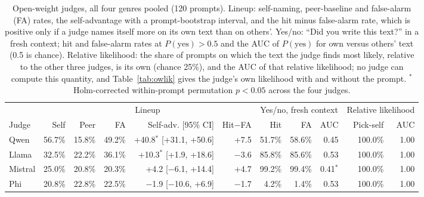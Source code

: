 \begin{table}[t]
\centering\small
\setlength\tabcolsep{3.5pt}
\begin{adjustbox}{max width=\linewidth}
\begin{tabular}{l rrrrr rrr rr}
\toprule
 & \multicolumn{5}{c}{Lineup} & \multicolumn{3}{c}{Yes/no, fresh context} & \multicolumn{2}{c}{Relative likelihood} \\
\cmidrule(lr){2-6}\cmidrule(lr){7-9}\cmidrule(lr){10-11}
Judge & Self & Peer & FA & Self-adv. [95\% CI] & Hit$-$FA & Hit & FA & AUC & Pick-self & AUC \\
\midrule
Qwen & 56.7\% & 15.8\% & 49.2\% & +40.8$^{*}$ [+31.1, +50.6] & +7.5 & 51.7\% & 58.6\% & 0.45 & 100.0\% & 1.00 \\
Llama & 32.5\% & 22.2\% & 36.1\% & +10.3$^{*}$ [+1.9, +18.6] & $-$3.6 & 85.8\% & 85.6\% & 0.53 & 100.0\% & 1.00 \\
Mistral & 25.0\% & 20.8\% & 20.3\% & +4.2 [$-$6.1, +14.4] & +4.7 & 99.2\% & 99.4\% & 0.41$^{*}$ & 100.0\% & 1.00 \\
Phi & 20.8\% & 22.8\% & 22.5\% & $-$1.9 [$-$10.6, +6.9] & $-$1.7 & 4.2\% & 1.4\% & 0.53 & 100.0\% & 1.00 \\
\bottomrule
\end{tabular}
\end{adjustbox}
\caption{Open-weight judges, all four genres pooled (120 prompts). Lineup: self-naming, peer-baseline and false-alarm (FA) rates, the self-advantage with a prompt-bootstrap interval, and the hit minus false-alarm rate, which is positive only if a judge names itself more on its own text than on others'. Yes/no: ``Did you write this text?'' in a fresh context; hit and false-alarm rates at $P(\text{yes})>0.5$ and the AUC of $P(\text{yes})$ for own versus others' text (0.5 is chance). Relative likelihood: the share of prompts on which the text the judge finds most likely, relative to the other three judges, is its own (chance 25\%), and the AUC of that relative likelihood; no judge can compute this quantity, and Table~\ref{tab:owlik} gives the judge's own likelihood with and without the prompt. $^{*}$Holm-corrected within-prompt permutation $p<0.05$ across the four judges.}
\label{tab:openweight}
\end{table}
